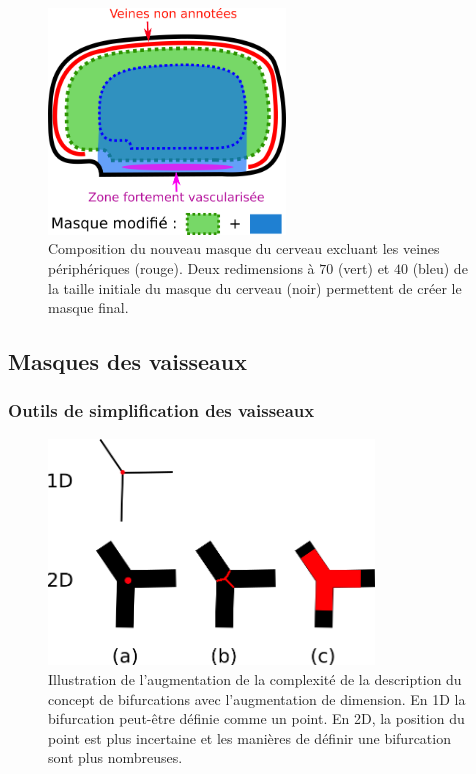 \begin{figure}[!ht]
  \centering
  \includegraphics[height=6cm]{Images/bullitt_new_mask.png}
  \caption{Composition du nouveau masque du cerveau excluant les veines périphériques (rouge). Deux redimensions à $70$ \percent{} (vert) et $40$ \percent{} (bleu) de la taille initiale du masque du cerveau (noir) permettent de créer le masque final.}
  \label{fig:masques_Bullitt_new}
\end{figure}

\subsection{Masques des vaisseaux}
\subsubsection{Outils de simplification des vaisseaux}


\begin{figure}[!ht]
  \centering
  \includegraphics[height=6cm]{Images/shape_abstraction.png}
  \caption{Illustration de l'augmentation de la complexité de la description du concept de bifurcations avec l'augmentation de dimension. En 1D la bifurcation peut-être définie comme un point. En 2D, la position du point est plus incertaine et les manières de définir une bifurcation sont plus nombreuses.}
  \label{fig:shape_abstraction}
\end{figure}

